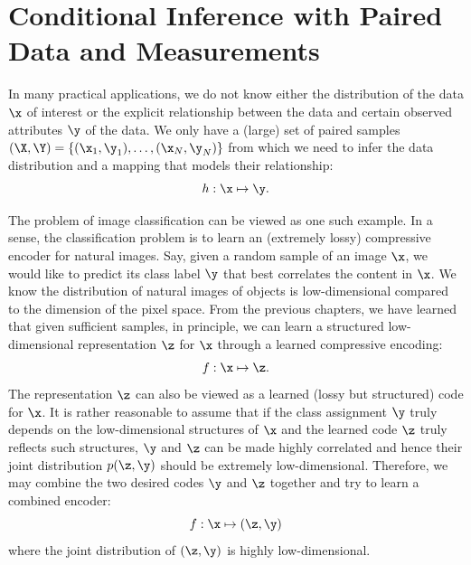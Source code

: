 \documentclass[../../book-main.tex]{subfiles}
\begin{document}
\section{Conditional Inference with Paired Data and Measurements}
In many practical applications, we do not know either the distribution of the data $\x$ of interest or the explicit relationship between the data and certain observed attributes $\y$ of the data. We only have  a (large) set of paired samples $(\X, \Y) = \{ (\x_1, \y_1), \ldots, (\x_N, \y_N) \}$ from which we need to infer the data distribution and a mapping that models their relationship:
\begin{equation}
  h: \x \mapsto \y.
\end{equation}

The problem of image classification can be viewed as one such example. In a sense, the classification problem is to learn an (extremely lossy) compressive encoder for natural images. Say, given a random sample of an image $\x$, we would like to predict its class label $\y$ that best correlates the content in $\x$. We know the distribution of natural images of objects is low-dimensional compared to the dimension of the pixel space. From the previous chapters, we have learned that given sufficient samples, in principle, we can learn a structured low-dimensional representation $\z$ for $\x$ through a learned compressive encoding:
\begin{equation}
    f: \x \mapsto \z. 
\end{equation}
The representation $\z$ can also be viewed as a learned (lossy but structured) code for $\x$. It is rather reasonable to assume that if the class assignment $\y$ truly depends on the low-dimensional structures of $\x$ and the learned code $\z$ truly reflects such structures, $\y$ and $\z$ can be made highly correlated and hence their joint distribution $p(\z, \y)$ should be extremely low-dimensional. Therefore, we may combine the two desired codes $\y$ and $\z$ together and try to learn a combined encoder:
\begin{equation}
    f: \x \mapsto (\z, \y) 
\end{equation}
where the joint distribution of $(\z, \y)$ is highly low-dimensional. 
\end{document}
